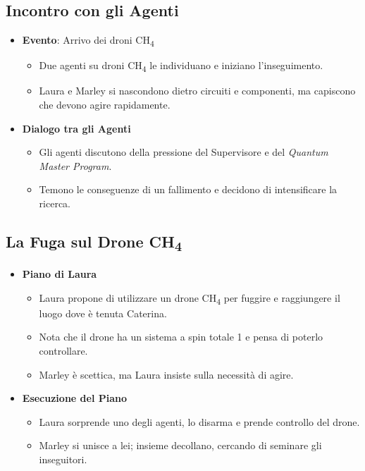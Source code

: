 \subsection*{Incontro con gli Agenti}

\begin{itemize}
    \item \textbf{Evento}: Arrivo dei droni CH\textsubscript{4}
    \begin{itemize}
        \item Due agenti su droni CH\textsubscript{4} le individuano e iniziano l'inseguimento.
        \item Laura e Marley si nascondono dietro circuiti e componenti, ma capiscono che devono agire rapidamente.
    \end{itemize}

    \item \textbf{Dialogo tra gli Agenti}
    \begin{itemize}
        \item Gli agenti discutono della pressione del Supervisore e del \emph{Quantum Master Program}.
        \item Temono le conseguenze di un fallimento e decidono di intensificare la ricerca.
    \end{itemize}
\end{itemize}

\subsection*{La Fuga sul Drone CH\textsubscript{4}}

\begin{itemize}
    \item \textbf{Piano di Laura}
    \begin{itemize}
        \item Laura propone di utilizzare un drone CH\textsubscript{4} per fuggire e raggiungere il luogo dove è tenuta Caterina.
        \item Nota che il drone ha un sistema a spin totale 1 e pensa di poterlo controllare.
        \item Marley è scettica, ma Laura insiste sulla necessità di agire.
    \end{itemize}

    \item \textbf{Esecuzione del Piano}
    \begin{itemize}
        \item Laura sorprende uno degli agenti, lo disarma e prende controllo del drone.
        \item Marley si unisce a lei; insieme decollano, cercando di seminare gli inseguitori.
    \end{itemize}
\end{itemize}

